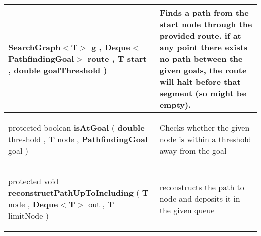{\begin{tabularx}{\linewidth}{X|m{}}
\begin{raggedleft}
\hspace*{ 5pt} \textbf{SearchGraph$<$T$>$} g , \newline
 \hspace*{ 5pt} \textbf{Deque$<$PathfindingGoal$>$} route , \newline
 \hspace*{ 5pt} \textbf{T} start , \newline
 \hspace*{ 5pt} \textbf{double} goalThreshold  )
\end{raggedleft} &
 Finds a path from the start node through the provided route. if at any point there exists no path between the given goals, the route will halt before that segment (so might be empty).\\ \hline 
\begin{raggedleft}protected boolean \textbf{isAtGoal }(\newline \hfill 
\hspace*{ 5pt} \textbf{double} threshold , \newline
 \hspace*{ 5pt} \textbf{T} node , \newline
 \hspace*{ 5pt} \textbf{PathfindingGoal} goal  )
\end{raggedleft} &
 Checks whether the given node is within a threshold away from the goal\\ \hline 
\begin{raggedleft}protected void \textbf{reconstructPathUpToIncluding }(\newline \hfill 
\hspace*{ 5pt} \textbf{T} node , \newline
 \hspace*{ 5pt} \textbf{Deque$<$T$>$} out , \newline
 \hspace*{ 5pt} \textbf{T} limitNode  )
\end{raggedleft} &
 reconstructs the path to node and deposits it in the given queue\\\end{tabularx}
}
